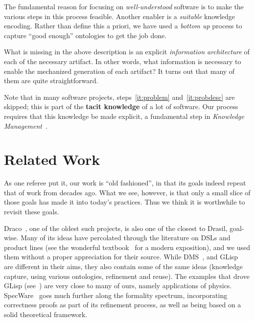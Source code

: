 \documentclass[a4paper,UKenglish,cleveref,autoref,thm-restate]{oasics-v2021}
\begin{document}
The fundamental reason for focusing on \emph{well-understood} software is to
make the various steps in this process feasible. Another enabler is a
\emph{suitable} knowledge encoding. Rather than define this a priori, we have
used a \emph{bottom up} process to capture ``good enough'' ontologies to get the
job done.

What is missing in the above description is an explicit \emph{information
architecture} of each of the necessary artifact. In other words, what
information is necessary to enable the mechanized generation of each artifact?
It turns out that many of them are quite straightforward.

Note that in many software projects, steps~\ref{it:problem}
and~\ref{it:probdesc} are skipped; this is part of the \textbf{tacit knowledge}
of a lot of software.  Our process requires that this knowledge be made
explicit, a fundamental step in \emph{Knowledge Management}~\cite{Dalkir2011}.


\section{Related Work}\label{sec:relwork}

As one referee put it, our work is ``old fashioned'', in that its goals
indeed repeat that of work from decades ago. What we see, however, is
that only a small slice of those goals has made it into today's
practices. Thus we think it is worthwhile to revisit these goals.

Draco~\cite{neighbors1984draco,neighbors1989draco}, one of the oldest
such projects, is also one of the closest to Drasil, goal-wise. Many of
its ideas have percolated through the literature on DSLs and product
lines (see the wonderful textbook~\cite{apel2016feature} for a modern
exposition), and we used them without a proper appreciation for their
source. While DMS~\cite{baxter1992design,baxter2002dms}, and
GLisp~\cite{novak1983glisp,DBLP:journals/tse/Novak95a} are different in their
aims, they also contain some of the same ideas (knowledge capture,
using various ontologies, refinement and reuse). The examples that
drove GLisp (see~\cite{novak1994generating,kook1991representation})
are very close to many of ours, namely applications of physics.
SpecWare~\cite{srinivas95specware,smith1999mechanizing} goes much
further along the formality spectrum, incorporating correctness proofs
as part of its refinement process, as well as being based on a solid
theoretical framework.
\end{document}
